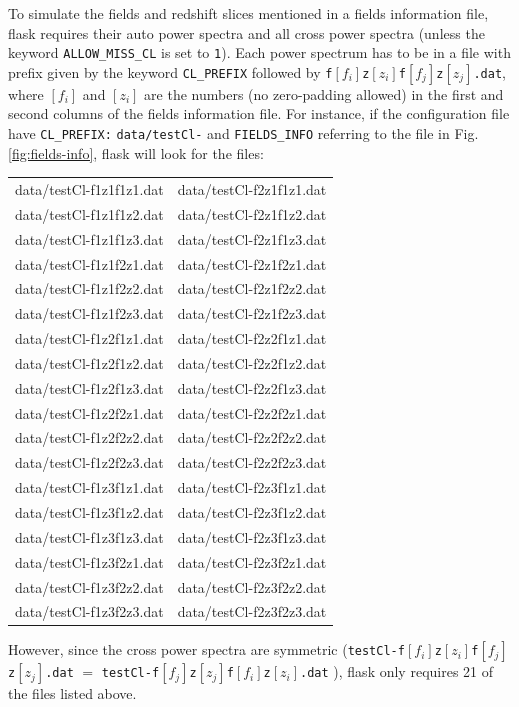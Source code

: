 \documentclass[12pt]{book} %
\newenvironment{alltt}{\ttfamily}{\par}
\begin{document}
To simulate the fields and redshift slices mentioned in a fields information file, 
{\sc flask} requires their auto power spectra and all cross power spectra (unless 
the keyword {\tt ALLOW\_MISS\_CL} is set to {\tt 1}). Each power spectrum has to 
be in a file with prefix given by the keyword {\tt CL\_PREFIX} followed by 
{\tt f}$[f_i]${\tt z}$[z_i]${\tt f}$[f_j]${\tt z}$[z_j]${\tt .dat}, where 
$[f_i]$ and $[z_i]$ are the numbers (no zero-padding allowed) in the first and 
second columns of the fields information file. For instance, if 
the configuration file have {\tt CL\_PREFIX:} {\tt data/testCl-} and 
{\tt FIELDS\_INFO} referring to the file in Fig. \ref{fig:fields-info}, 
{\sc flask} will look for the files:

\begin{alltt}
\begin{center}
\begin{tabular}{cc}
 data/testCl-f1z1f1z1.dat & data/testCl-f2z1f1z1.dat \\
 data/testCl-f1z1f1z2.dat & data/testCl-f2z1f1z2.dat \\ 
 data/testCl-f1z1f1z3.dat & data/testCl-f2z1f1z3.dat \\
 data/testCl-f1z1f2z1.dat & data/testCl-f2z1f2z1.dat \\
 data/testCl-f1z1f2z2.dat & data/testCl-f2z1f2z2.dat \\
 data/testCl-f1z1f2z3.dat & data/testCl-f2z1f2z3.dat \\
 data/testCl-f1z2f1z1.dat & data/testCl-f2z2f1z1.dat \\
 data/testCl-f1z2f1z2.dat & data/testCl-f2z2f1z2.dat \\
 data/testCl-f1z2f1z3.dat & data/testCl-f2z2f1z3.dat \\
 data/testCl-f1z2f2z1.dat & data/testCl-f2z2f2z1.dat \\
 data/testCl-f1z2f2z2.dat & data/testCl-f2z2f2z2.dat \\
 data/testCl-f1z2f2z3.dat & data/testCl-f2z2f2z3.dat \\
 data/testCl-f1z3f1z1.dat & data/testCl-f2z3f1z1.dat \\
 data/testCl-f1z3f1z2.dat & data/testCl-f2z3f1z2.dat \\
 data/testCl-f1z3f1z3.dat & data/testCl-f2z3f1z3.dat \\
 data/testCl-f1z3f2z1.dat & data/testCl-f2z3f2z1.dat \\
 data/testCl-f1z3f2z2.dat & data/testCl-f2z3f2z2.dat \\
 data/testCl-f1z3f2z3.dat & data/testCl-f2z3f2z3.dat \\
\end{tabular}
\end{center}
\end{alltt}
However, since the cross power spectra are symmetric 
({\tt testCl-f}$[f_i]${\tt z}$[z_i]${\tt f}$[f_j]${\tt z}$[z_j]${\tt .dat} $=$ 
 {\tt testCl-f}$[f_j]${\tt z}$[z_j]${\tt f}$[f_i]${\tt z}$[z_i]${\tt .dat} ), 
{\sc flask} only requires 21 of the files listed above.
\end{document}
